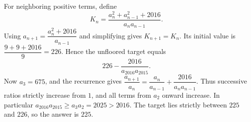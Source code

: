 For neighboring positive terms, define
\[
K_n=\dfrac{a_n^2+a_{n-1}^2+2016}{a_na_{n-1}}.
\]
Using $a_{n+1}=\dfrac{a_n^2+2016}{a_{n-1}}$ and simplifying gives $K_{n+1}=K_n$. Its initial value is $\dfrac{9+9+2016}{9}=226$. Hence the unfloored target equals
\[
226-\dfrac{2016}{a_{2016}a_{2015}}.
\]
Now $a_3=675$, and the recurrence gives
$\dfrac{a_{n+1}}{a_n}=\dfrac{a_n}{a_{n-1}}+\dfrac{2016}{a_na_{n-1}}$.
Thus successive ratios strictly increase from $1$, and all terms from $a_2$ onward increase. In particular $a_{2016}a_{2015}\ge a_3a_2=2025>2016$. The target lies strictly between $225$ and $226$, so the answer is $\boxed{225}$.
